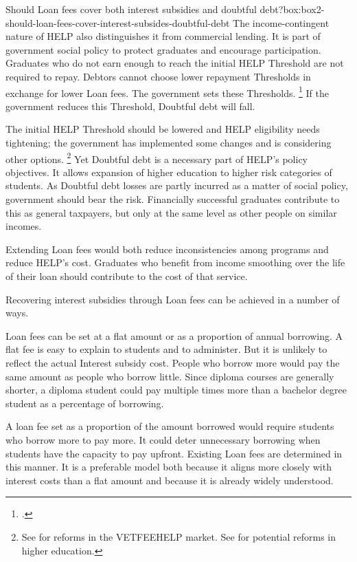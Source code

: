 \documentclass{grattan}
\begin{document}
\begin{bigbox*}{Should \gls{Loan fees} cover both interest subsidies and doubtful debt?}{box:box2-should-loan-fees-cover-interest-subsides-doubtful-debt}
The income-contingent nature of \gls{HELP} also distinguishes it from commercial lending.
It is part of government social policy to protect graduates and encourage participation.
Graduates who do not earn enough to reach the initial \gls{HELP} \gls{Threshold} are not required to repay.
Debtors cannot choose lower repayment \gls{Threshold}s in exchange for lower \gls{Loan fees}.
The government sets these \gls{Threshold}s.%
   \footnote{\textcite[][Figure~16]{Norton2014Doubtfuldebtrising}.} 
If the government reduces this \gls{Threshold}, \gls{Doubtful debt} will fall.

The initial \gls{HELP} \gls{Threshold} should be lowered and \gls{HELP} eligibility needs tightening; the government has implemented some changes and is considering other options.%
   \footnote{See \textcites{Ryan2016RedesigningVETFEE}{Birmingham2016MediareleaseNew} for reforms in the \gls{VETFEEHELP} market. See \textcite{Education2016DrivingInnovationFairness} for potential reforms in higher education.} 
Yet \gls{Doubtful debt} is a necessary part of \gls{HELP}'s policy objectives.
It allows expansion of higher education to higher risk categories of students.
As \gls{Doubtful debt} losses are partly incurred as a matter of social policy, government should bear the risk.
Financially successful graduates contribute to this as general taxpayers, but only at the same level as other people on similar incomes.
\end{bigbox*}

Extending \gls{Loan fees} would both reduce inconsistencies among programs and reduce \gls{HELP}'s cost.
Graduates who benefit from income smoothing over the life of their loan should contribute to the cost of that service. 

Recovering interest subsidies through \gls{Loan fees} can be achieved in a number of ways.

\Gls{Loan fees} can be set at a flat amount or as a proportion of annual borrowing.
A flat fee is easy to explain to students and to administer.
But it is unlikely to reflect the actual \gls{Interest subsidy} cost.
People who borrow more would pay the same amount as people who borrow little.
Since diploma courses are generally shorter, a diploma student could pay multiple times more than a bachelor degree student as a percentage of borrowing.

A loan fee set as a proportion of the amount borrowed would require students who borrow more to pay more.
It could deter unnecessary borrowing when students have the capacity to pay upfront.
Existing \gls{Loan fees} are determined in this manner.
It is a preferable model both because it aligns more closely with interest costs than a flat amount and because it is already widely understood.
\end{document}
